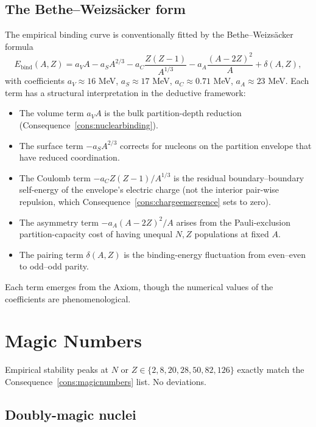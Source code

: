 \documentclass[11pt,twocolumn,a4paper]{article}
\theoremstyle{axiomstyle}
\theoremstyle{conseqstyle}
\theoremstyle{definition}
\theoremstyle{remark}
\begin{document}
\subsection{The Bethe--Weizs\"acker form}

The empirical binding curve is conventionally fitted by the Bethe--Weizs\"acker formula
\begin{equation*}
E_{\text{bind}}(A,Z)=a_{V}A-a_{S}A^{2/3}-a_{C}\frac{Z(Z-1)}{A^{1/3}}-a_{A}\frac{(A-2Z)^{2}}{A}+\delta(A,Z),
\end{equation*}
with coefficients $a_{V}\approx 16$ MeV, $a_{S}\approx 17$ MeV, $a_{C}\approx 0.71$ MeV, $a_{A}\approx 23$ MeV. Each term has a structural interpretation in the deductive framework:
\begin{itemize}
\item The volume term $a_{V}A$ is the bulk partition-depth reduction (Consequence~\ref{cons:nuclearbinding}).
\item The surface term $-a_{S}A^{2/3}$ corrects for nucleons on the partition envelope that have reduced coordination.
\item The Coulomb term $-a_{C}Z(Z-1)/A^{1/3}$ is the residual boundary--boundary self-energy of the envelope's electric charge (not the interior pair-wise repulsion, which Consequence~\ref{cons:chargeemergence} sets to zero).
\item The asymmetry term $-a_{A}(A-2Z)^{2}/A$ arises from the Pauli-exclusion partition-capacity cost of having unequal $N,Z$ populations at fixed $A$.
\item The pairing term $\delta(A,Z)$ is the binding-energy fluctuation from even--even to odd--odd parity.
\end{itemize}

Each term emerges from the Axiom, though the numerical values of the coefficients are phenomenological.

\section{Magic Numbers}
\label{sec:magicempirical}

Empirical stability peaks at $N$ or $Z\in\{2,8,20,28,50,82,126\}$ \citep{mayer1949,haxeljensensuess1949,krane1988} exactly match the Consequence~\ref{cons:magicnumbers} list. No deviations.

\subsection{Doubly-magic nuclei}
\end{document}
